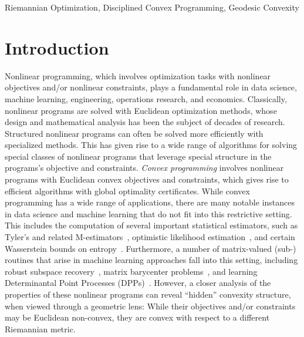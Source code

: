 \documentclass[twoside,11pt]{article}
\begin{document}
\begin{keywords}%
    Riemannian Optimization, Disciplined Convex Programming, Geodesic Convexity
\end{keywords}

\section{Introduction}
Nonlinear programming, which involves optimization tasks with nonlinear objectives and/or nonlinear constraints, plays a fundamental role in data science, machine learning, engineering, operations research, and economics. Classically, nonlinear programs are solved with Euclidean optimization methods, whose design and mathematical analysis has been the subject of decades of research. Structured nonlinear programs can often be solved more efficiently with specialized methods. This has given rise to a wide range of algorithms for solving special classes of nonlinear programs that leverage special structure in the programs’s objective and constraints. \emph{Convex programming} involves nonlinear programs with Euclidean convex objectives and constraints, which gives rise to efficient algorithms with global optimality certificates. While convex programming has a wide range of applications, there are many notable instances in data science and machine learning that do not fit into this restrictive setting. This includes the computation of several important statistical estimators, such as Tyler's and related M-estimators~\citep{Tyler1987,wiesel2012geodesic,ollila2014regularized}, optimistic likelihood estimation~\citep{nguyen2019calculating}, and certain Wasserstein bounds on entropy~\citep{courtade2017wasserstein}. Furthermore, a number of matrix-valued (sub-) routines that arise in machine learning approaches fall into this setting, including robust subspace recovery~\citep{zhang2016robust}, matrix barycenter problems~\citep{Bhatia1997_matrixanalysis}, and learning Determinantal Point Processes (DPPs)~\citep{mariet2015fixed}. However, a closer analysis of the properties of these nonlinear programs can reveal “hidden” convexity structure, when viewed through a geometric lens: While their objectives and/or constraints may be Euclidean non-convex, they are convex with respect to a different Riemannian metric.
\end{document}
